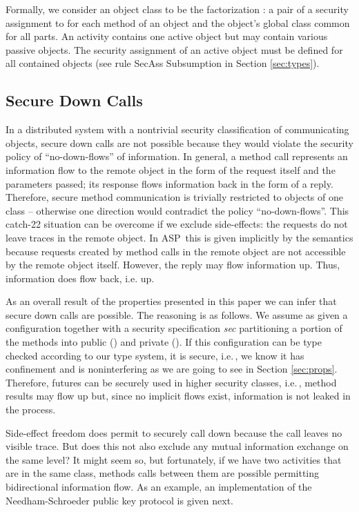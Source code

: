 \documentclass[10pt, conference, compsocconf]{IEEEtran}
\newcommand\aspfun{ASP\ }
\newcommand\ie{i.e.\!\,, }
\begin{document}
{Formally, we consider an object class to be the factorization 
: a pair of a security assignment
to  for each method  of an object and the object's global class  common for all parts.
An activity contains one active object but may contain various passive
objects. 
The security assignment of an active object must be defined for all contained objects
(see rule {\sc SecAss Subsumption} in Section \ref{sec:types}).









\subsection{Secure Down Calls}
In a distributed system with a nontrivial security classification of communicating objects,
secure down calls are not possible because they would violate the security
policy of ``no-down-flows'' of information.
In general, a method call represents an information flow to the remote object
in the form of the request itself and the parameters passed; 
its response flows information back in the form of a reply.
Therefore, secure method communication is trivially restricted to objects of one class --
otherwise one direction would contradict the policy ``no-down-flows''.
This catch-22 situation can be overcome if we exclude side-effects: the requests do not leave traces in the remote object. 
In \aspfun this is given implicitly by the semantics because requests created by method 
calls in the remote object are not accessible by the remote object itself.
However, the reply may flow information up. Thus, information does flow back, i.e. up. 


As an overall result of the properties presented in this paper we can infer
that secure down calls are possible. The reasoning is as follows.
We assume as given a configuration together with a security specification {\it sec}
partitioning a portion of the methods into public () and private ().
If this configuration can be type checked according to our type system, it is secure,
\ie we know it  has confinement and is noninterfering as we are going to see in Section
\ref{sec:props}. Therefore, futures can be securely used in higher
security classes, \ie method results may flow up but, since no implicit flows exist, 
information is not leaked in the process.

Side-effect freedom does permit to securely call down because the call leaves no visible trace.
But does this not also exclude any mutual information exchange on the same level? It might 
seem so, but fortunately,
if we have two activities that are in the same class, methods 
calls between them are possible permitting bidirectional information flow. As an example, an
implementation of the Needham-Schroeder public key protocol is given next.

}
\end{document}
